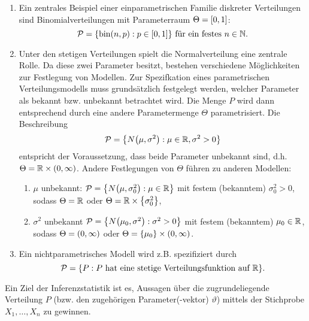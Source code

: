 \documentclass{lecture}
\begin{document}
    \begin{example}
        \begin{enumerate}
            \item Ein zentrales Beispiel einer einparametrischen Familie diskreter Verteilungen sind Binomialverteilungen mit Parameterraum \(\Theta = \brackets*{0, 1}\):
            \[
                \mathcal{P} = \braces*{\bin\parentheses*{n, p} : p \in \brackets*{0, 1}}\text{ für ein festes }n \in \N.
            \]
            \item  Unter den stetigen Verteilungen spielt die Normalverteilung eine zentrale Rolle.
            Da diese zwei Parameter besitzt, bestehen verschiedene Möglichkeiten zur Festlegung von Modellen.
            Zur Spezifkation eines parametrischen Verteilungsmodells muss grundsätzlich festgelegt werden, welcher Parameter als bekannt bzw. unbekannt betrachtet wird.
            Die Menge \(P\) wird dann entsprechend durch eine andere Parametermenge \(\Theta\) parametrisiert.
            Die Beschreibung
            \[
                \mathcal{P} = \braces*{N\parentheses*{\mu, \sigma^2} : \mu \in \R, \sigma^2 > 0}
            \]
            entspricht der Voraussetzung, dass beide Parameter unbekannt sind, d.h. \(\Theta = \R \times \parentheses*{0, \infty}\).
            Andere Festlegungen von \(\Theta\) führen zu anderen Modellen:
            \begin{enumerate}[label=\alph*)]
                \item \(\mu\) unbekannt: \(\mathcal{P} = \braces*{N\parentheses*{\mu, \sigma_0^2} : \mu \in \R}\) mit festem (bekanntem) \(\sigma_0^2 > 0\), sodass \(\Theta = \R\) oder \(\Theta = \R \times \braces*{\sigma_0^2}\),
                \item \(\sigma^2\) unbekannt \(\mathcal{P} = \braces*{N\parentheses*{\mu_0, \sigma^2} : \sigma^2 > 0}\) mit festem (bekanntem) \(\mu_0 \in \R\), sodass \(\Theta = \parentheses*{0, \infty}\) oder \(\Theta = \braces*{\mu_0} \times \parentheses*{0, \infty}\).
            \end{enumerate}
            \item Ein nichtparametrisches Modell wird z.B. spezifiziert durch
            \[
                \mathcal{P} = \braces*{P : P\text{ hat eine stetige Verteilungsfunktion auf }\R}.
            \]
        \end{enumerate}
    \end{example}

    Ein Ziel der Inferenzstatistik ist es, Aussagen über die zugrundeliegende Verteilung \(P\) (bzw. den zugehörigen Parameter(-vektor) \(\vartheta\)) mittels der Stichprobe \(X_1, \ldots, X_n\) zu gewinnen.
\end{document}
